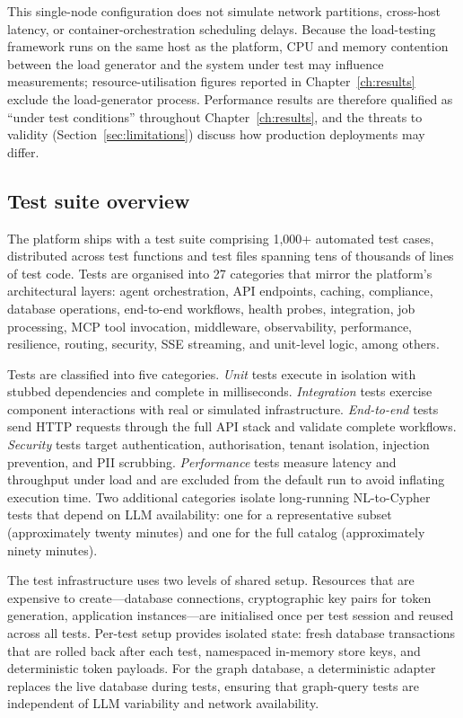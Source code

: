 \documentclass[a4paper,noexaminfo]{sapthesis}
\newcommand{\TestCount}{1,000+}
\begin{document}
This single-node configuration does not simulate network partitions,
cross-host latency, or container-orchestration scheduling delays.
Because the load-testing framework runs on the same host as the platform,
CPU and memory contention between the load generator and the system under
test may influence measurements; resource-utilisation figures reported in
Chapter~\ref{ch:results} exclude the load-generator process.
Performance results are therefore qualified as ``under test conditions''
throughout Chapter~\ref{ch:results}, and the threats to validity
(Section~\ref{sec:limitations}) discuss how production deployments may
differ.

\subsection{Test suite overview}
\label{sec:test-suite-overview}

The platform ships with a test suite comprising \TestCount{}
automated test cases, distributed across test functions and test files
spanning tens of thousands of lines of test code.  Tests are organised into 27 categories that mirror
the platform's architectural layers: agent orchestration, API endpoints,
caching, compliance, database operations, end-to-end workflows, health
probes, integration, job processing, MCP tool invocation, middleware,
observability, performance, resilience, routing, security, SSE streaming,
and unit-level logic, among others.

Tests are classified into five categories.  \emph{Unit} tests
execute in isolation with stubbed dependencies and complete in
milliseconds.  \emph{Integration} tests exercise component interactions
with real or simulated infrastructure.  \emph{End-to-end} tests send
HTTP requests through the full API stack and validate complete workflows.
\emph{Security} tests target authentication, authorisation, tenant
isolation, injection prevention, and PII scrubbing.  \emph{Performance}
tests measure latency and throughput under load and are excluded from the
default run to avoid inflating execution time.  Two additional categories
isolate long-running NL-to-Cypher tests that depend on LLM availability:
one for a representative subset (approximately twenty minutes) and one
for the full catalog (approximately ninety minutes).

The test infrastructure uses two levels of shared setup.  Resources that
are expensive to create---database connections, cryptographic key pairs
for token generation, application instances---are initialised once per
test session and reused across all tests.  Per-test setup provides
isolated state: fresh database transactions that are rolled back after
each test, namespaced in-memory store keys, and deterministic token
payloads.  For the graph database, a deterministic adapter replaces the
live database during tests, ensuring that graph-query tests are
independent of LLM variability and network availability.
\end{document}
